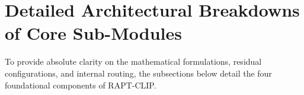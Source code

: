 \documentclass[11pt,a4paper]{article}
\begin{document}
\newpage

\section*{Detailed Architectural Breakdowns of Core Sub-Modules}
To provide absolute clarity on the mathematical formulations, residual configurations, and internal routing, the subsections below detail the four foundational components of RAPT-CLIP.

\vspace{1em}

\end{document}

